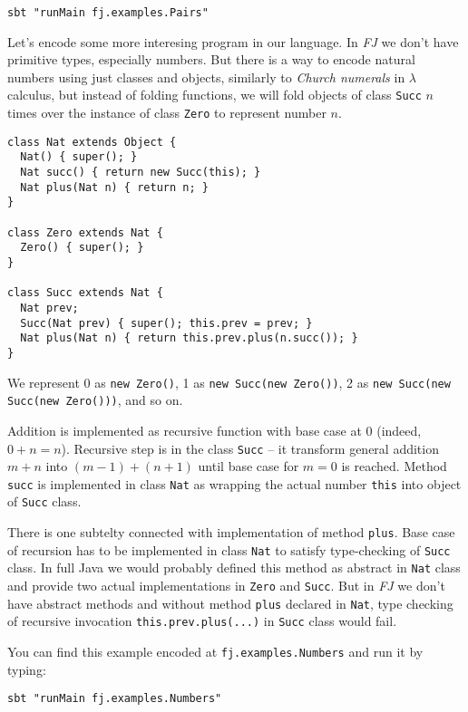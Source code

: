 \documentclass{article}[12pt]
\begin{document}
\begin{verbatim}
sbt "runMain fj.examples.Pairs"
\end{verbatim}

Let's encode some more interesing program in our language. In \emph{FJ} we don't have primitive types, especially numbers. But there is a way to encode natural numbers using just classes and objects, similarly to \emph{Church numerals} in $\lambda$ calculus, but instead of folding functions, we will fold objects of class \texttt{Succ} $n$ times over the instance of class \texttt{Zero} to represent number $n$.

\begin{verbatim}
class Nat extends Object {
  Nat() { super(); }
  Nat succ() { return new Succ(this); }
  Nat plus(Nat n) { return n; }
}

class Zero extends Nat { 
  Zero() { super(); }
}

class Succ extends Nat {
  Nat prev;
  Succ(Nat prev) { super(); this.prev = prev; }
  Nat plus(Nat n) { return this.prev.plus(n.succ()); }
}
\end{verbatim}

We represent 0 as \texttt{new Zero()}, 1 as \texttt{new Succ(new Zero())}, 2 as \texttt{new Succ(new Succ(new Zero()))}, and so on.

Addition is implemented as recursive function with base case at 0 (indeed, $0 + n = n$). Recursive step is in the class \texttt{Succ} -- it transform general addition $m + n$ into $(m-1) + (n+1)$ until base case for $m = 0$ is reached. Method \texttt{succ} is implemented in class \texttt{Nat} as wrapping the actual number \texttt{this} into object of \texttt{Succ} class.

There is one subtelty connected with implementation of method \texttt{plus}. Base case of recursion has to be implemented in class \texttt{Nat} to satisfy type-checking of \texttt{Succ} class. In full Java we would probably defined this method as abstract in \texttt{Nat} class and provide two actual implementations in \texttt{Zero} and \texttt{Succ}. But in  \emph{FJ} we don't have abstract methods and without method \texttt{plus} declared in \texttt{Nat}, type checking of recursive invocation \texttt{this.prev.plus(...)} in \texttt{Succ} class would fail.

You can find this example encoded at \texttt{fj.examples.Numbers} and run it by typing:

\begin{verbatim}
sbt "runMain fj.examples.Numbers"
\end{verbatim}
\end{document}

